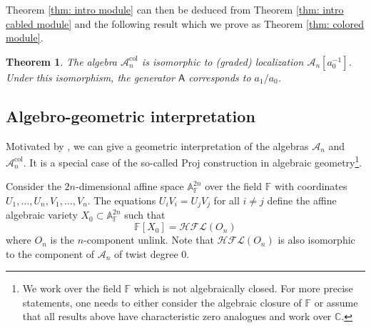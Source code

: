 \documentclass{amsart}
\newtheorem{theorem}{Theorem}[section]
\newcommand{\CA}{\mathcal{A}}
\newcommand{\col}{\mathrm{col}}
\newcommand{\F}{\mathbb{F}}
\newcommand{\C}{\mathbb{C}}
\newcommand{\cHFL}{\mathcal{H\!F\! L}}
\newcommand{\HFL}{\mathit{HFL}}
\newcommand{\EG}[1]{{\color{red}#1}}
\newcommand{\AAA}{\mathsf{A}}
\begin{document}
Theorem \ref{thm: intro module} can then be deduced from Theorem \ref{thm: intro cabled module} and the following result which we prove as Theorem \ref{thm: colored module}.

\begin{theorem}
\label{thm: intro localization}
The algebra $\CA_n^{\col}$ is isomorphic to (graded) localization $\CA_n[a_0^{-1}]$. Under this isomorphism, the generator $\AAA$ corresponds to $a_1/a_0$.
\end{theorem}











\subsection{Algebro-geometric interpretation}

Motivated by \cite{GH,GNR}, we can give a geometric interpretation of the algebras $\CA_n$ and $\CA_n^{\col}$. It is a special case of the so-called $\mathrm{Proj}$ construction in algebraic geometry\footnote{We work over the field $\F$ which is not algebraically closed. For more precise statements, one needs to either consider the algebraic closure of $\F$ or assume that all results above have characteristic zero analogues and work over $\C$.}.


Consider the $2n$-dimensional affine space $\mathbb{A}^{2n}_{\F}$ over the field $\F$ with coordinates $U_1,\ldots,U_n,V_1,\ldots,V_n.$ The equations $U_iV_i=U_jV_j$ for all $i\neq j$ define the affine algebraic variety 
$X_0\subset \mathbb{A}^{2n}_{\F}$ such that 
$$
\F[X_0]=\cHFL(O_n)
$$
where $O_n$ is the $n$-component unlink. Note that $\cHFL(O_n)$ is also isomorphic to the component of $\CA_n$ of twist degree 0.
\end{document}
